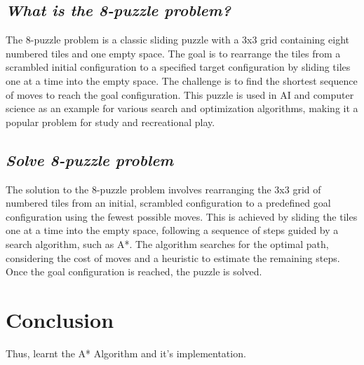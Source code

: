 \documentclass{article}
\begin{document}
\subsection{\textit{What is the 8-puzzle problem?}}
The 8-puzzle problem is a classic sliding puzzle with a 3x3 grid containing eight numbered tiles and one empty space. The goal is to rearrange the tiles from a scrambled initial configuration to a specified target configuration by sliding tiles one at a time into the empty space. The challenge is to find the shortest sequence of moves to reach the goal configuration. This puzzle is used in AI and computer science as an example for various search and optimization algorithms, making it a popular problem for study and recreational play.

\subsection{\textit{Solve 8-puzzle problem}}
The solution to the 8-puzzle problem involves rearranging the 3x3 grid of numbered tiles from an initial, scrambled configuration to a predefined goal configuration using the fewest possible moves. This is achieved by sliding the tiles one at a time into the empty space, following a sequence of steps guided by a search algorithm, such as A*. The algorithm searches for the optimal path, considering the cost of moves and a heuristic to estimate the remaining steps. Once the goal configuration is reached, the puzzle is solved.

\section{\textbf{Conclusion}}
Thus, learnt the A* Algorithm and it's implementation.
\end{document}
